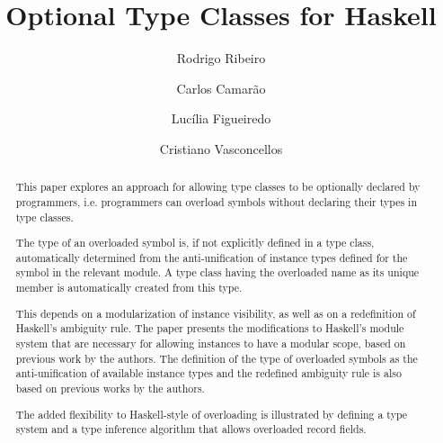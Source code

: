 \documentclass{llncs}
\begin{document}




%
\mainmatter              %

\title{Optional Type Classes for Haskell}

%
\author{Rodrigo Ribeiro  \and Carlos Camar\~ao \and Luc\'ilia
Figueiredo \and Cristiano Vasconcellos}
\maketitle              %

\begin{abstract}

This paper explores an approach for allowing type classes to be
optionally declared by programmers, i.e. programmers can overload
symbols without declaring their types in type classes.

The type of an overloaded symbol is, if not explicitly defined in a
type class, automatically determined from the anti-unification of
instance types defined for the symbol in the relevant module. A type
class having the overloaded name as its unique member is automatically
created from this type.

This depends on a modularization of instance visibility, as well as on
a redefinition of Haskell's ambiguity rule. The paper presents the
modifications to Haskell's module system that are necessary for
allowing instances to have a modular scope, based on previous work by
the authors. The definition of the type of overloaded symbols as the
anti-unification of available instance types and the redefined
ambiguity rule is also based on previous works by the authors.

The added flexibility to Haskell-style of overloading is illustrated
by defining a type system and a type inference algorithm that allows
overloaded record fields.


\end{abstract}







% 





% 





\end{document}
